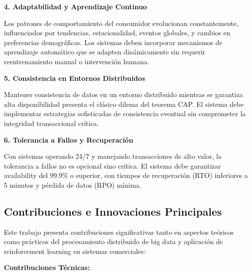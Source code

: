 \documentclass[conference,10pt,letterpaper]{IEEEtran}
\begin{document}
\vspace{0.2cm}

\textbf{4. Adaptabilidad y Aprendizaje Continuo}

Los patrones de comportamiento del consumidor evolucionan constantemente, influenciados por tendencias, estacionalidad, eventos globales, y cambios en preferencias demográficas. Los sistemas deben incorporar mecanismos de aprendizaje automático que se adapten dinámicamente sin requerir reentrenamiento manual o intervención humana.

\textbf{5. Consistencia en Entornos Distribuidos}

Mantener consistencia de datos en un entorno distribuido mientras se garantiza alta disponibilidad presenta el clásico dilema del teorema CAP. El sistema debe implementar estrategias sofisticadas de consistencia eventual sin comprometer la integridad transaccional crítica.

\textbf{6. Tolerancia a Fallos y Recuperación}

Con sistemas operando 24/7 y manejando transacciones de alto valor, la tolerancia a fallos no es opcional sino crítica. El sistema debe garantizar availability del 99.9\% o superior, con tiempos de recuperación (RTO) inferiores a 5 minutos y pérdida de datos (RPO) mínima.

\subsection{Contribuciones e Innovaciones Principales}
\label{subsec:contribuciones}

Este trabajo presenta contribuciones significativas tanto en aspectos teóricos como prácticos del procesamiento distribuido de big data y aplicación de reinforcement learning en sistemas comerciales:

\vspace{0.2cm}

\textbf{Contribuciones Técnicas:}
\end{document}
